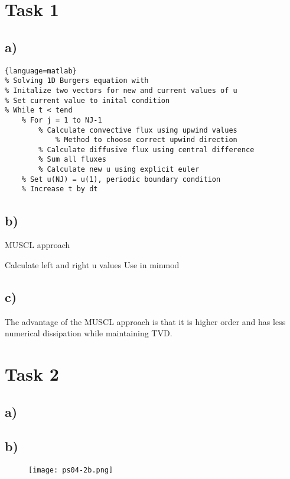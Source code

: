 \documentclass{article}
\begin{document}
\section{Task 1}


\subsection{a)}

\begin{lstlisting}{language=matlab}
% Solving 1D Burgers equation with
% Initalize two vectors for new and current values of u
% Set current value to inital condition
% While t < tend
	% For j = 1 to NJ-1
		% Calculate convective flux using upwind values
			% Method to choose correct upwind direction
		% Calculate diffusive flux using central difference
		% Sum all fluxes
		% Calculate new u using explicit euler
	% Set u(NJ) = u(1), periodic boundary condition
	% Increase t by dt
\end{lstlisting}

\subsection{b)}
MUSCL approach

Calculate left and right u values
Use in minmod

\subsection{c)}
The advantage of the MUSCL approach is that it is higher order and has less numerical dissipation while maintaining TVD.

\section{Task 2}

\subsection{a)}



\subsection{b)}
\begin{figure}
	\texttt{[image: ps04-2b.png]}
\end{figure}
\end{document}
